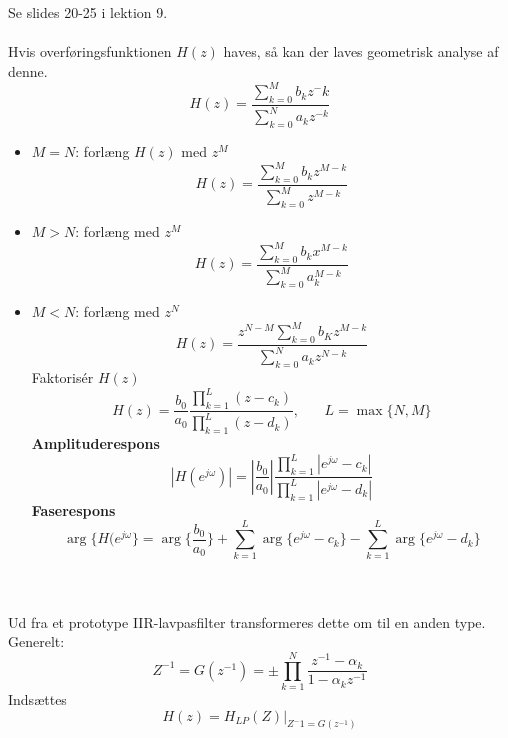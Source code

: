 \documentclass[12pt,a4paper]{report}
\begin{document}
\clearpage
{}\\\\ Se slides 20-25 i lektion 9.\\\\
Hvis overføringsfunktionen $H(z)$ haves, så kan der laves geometrisk analyse af denne.
\begin{equation}
H(z)=\frac{\sum_{k=0}^Mb_kz^-k}{\sum_{k=0}^Na_kz^{-k}}
\end{equation}
\begin{itemize}
\item $M=N$: forlæng $H(z)$ med $z^M$
\begin{equation}
H(z)=\frac{\sum_{k=0}^Mb_kz^{M-k}}{\sum_{k=0}^Mz^{M-k}}
\end{equation}
\item $M>N$: forlæng med $z^M$
\begin{equation}
H(z)=\frac{\sum_{k=0}^Mb_kx^{M-k}}{\sum_{k=0}^Ma_k^{M-k}}
\end{equation}
\item $M<N$: forlæng med $z^N$
\begin{equation}
H(z)=\frac{z^{N-M}\sum_{k=0}^Mb_Kz^{M-k}}{\sum_{k=0}^Na_kz^{N-k}}
\end{equation}
Faktorisér $H(z)$
\begin{equation}
H(z)=\frac{b_0}{a_0}\frac{\prod_{k=1}^L(z-c_k)}{\prod_{k=1}^L(z-d_k)},\phantom{mm}L=\max\{N,M\}
\end{equation}
\textbf{Amplituderespons}
\begin{equation}
|H(e^{j\omega})|=\left|\frac{b_0}{a_0}\right|\frac{\prod_{k=1}^L\left|e^{j\omega}-c_k\right|}{\prod_{k=1}^L\left|e^{j\omega}-d_k\right|}
\end{equation}
\textbf{Faserespons}
\begin{equation}
\arg\{H(e^{j\omega}\}=\arg\{\frac{b_0}{a_0}\}+\sum_{k=1}^L\arg\{e^{j\omega}-c_k\}-\sum_{k=1}^L\arg\{e^{j\omega}-d_k\}
\end{equation}
\end{itemize}
\clearpage
{}\\\\
Ud fra et prototype IIR-lavpasfilter transformeres dette om til en anden type. Generelt:
\begin{equation}
Z^{-1}=G(z^{-1})=\pm\prod_{k=1}^N\frac{z^{-1}-\alpha_k}{1-\alpha_kz^{-1}}
\end{equation}
Indsættes
\begin{equation}
H(z)=H_{LP}(Z)\bigg|_{Z^-1=G(z^{-1})}
\end{equation}
\end{document}
